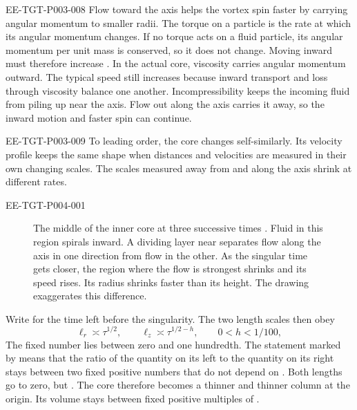 \begin{EESegment}{EE-TGT-P003-008}
Flow toward the axis helps the vortex spin faster by carrying angular momentum to smaller
radii. The torque on a particle is the rate at which its angular momentum changes. If no torque acts on a
fluid particle, its angular momentum per unit mass  is conserved,
so it does not change. Moving inward must therefore increase
. In the actual core, viscosity carries angular momentum outward.
The typical speed still increases because inward transport and loss through viscosity balance
one another. Incompressibility keeps the incoming fluid from piling up near the axis. Flow out
along the axis carries it away, so the inward motion and faster spin can continue.
\end{EESegment}

\begin{EESegment}{EE-TGT-P003-009}
To leading order, the core changes self-similarly. Its velocity profile keeps the same shape
when distances and velocities are measured in their own changing scales. The scales measured
away from and along the axis shrink at different rates.
\end{EESegment}

%
\begin{EESegment}{EE-TGT-P004-001}
\begin{figure}[t]
  \centering
  \caption{The middle of the inner core at three successive times
  . Fluid in this region spirals inward. A dividing layer
  near  separates flow along the axis in one direction from flow in the
  other. As the singular time gets closer, the region where the flow is strongest shrinks and
  its speed rises. Its radius shrinks faster than its height. The drawing exaggerates this
  difference.}\label{fig:1}
\end{figure}%

Write  for the time left before the singularity. The two length
scales then obey
\begin{equation*}
  \ell_r\asymp\tau^{1/2},
  \qquad \ell_z\asymp\tau^{1/2-h},
  \qquad 0<h<1/100,
\end{equation*}
The fixed number  lies between zero and one hundredth. The statement
marked by  means that the ratio of the quantity on its left to the
quantity on its right stays between two fixed positive numbers that do not depend on
. Both lengths go to zero, but
. The core therefore becomes a thinner and
thinner column at the origin. Its volume stays between fixed positive multiples of
.
\end{EESegment}

